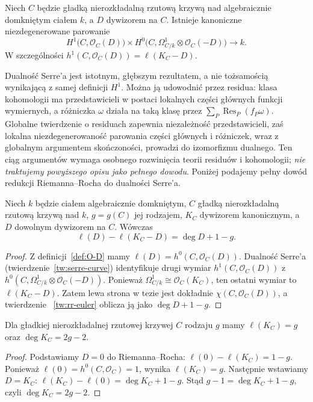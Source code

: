 \begin{twierdzenie}
\label{tw:serre-curve}
Niech $C$ będzie gładką nierozkładalną rzutową
krzywą nad algebraicznie domkniętym ciałem $k$,
a $D$ dywizorem na $C$. Istnieje kanoniczne
niezdegenerowane parowanie
\[
 H^1\bigl(C,\mathcal O_C(D)\bigr)
 \times H^0\bigl(C,\Omega^1_{C/k}\otimes
 \mathcal O_C(-D)\bigr)\longrightarrow k.
\]
W szczególności
$h^1(C,\mathcal O_C(D))=\ell(K_C-D)$.
\end{twierdzenie}

\begin{uwaga}
Dualność Serre'a jest istotnym, głębszym rezultatem,
a nie tożsamością wynikającą z samej definicji
$H^1$. Można ją udowodnić przez residua:
klasa kohomologii ma przedstawicieli w postaci
lokalnych części głównych funkcji wymiernych,
a różniczka $\omega$ działa na taką klasę przez
$\sum_P\operatorname{Res}_P(f_P\omega)$.
Globalne twierdzenie o residuach zapewnia
niezależność przedstawicieli, zaś lokalna
niezdegenerowaność parowania części głównych
i różniczek, wraz z globalnym argumentem
skończoności, prowadzi do izomorfizmu dualnego.
Ten ciąg argumentów wymaga osobnego rozwinięcia
teorii residuów i kohomologii; \emph{nie traktujemy
powyższego opisu jako pełnego dowodu}.
Poniżej podajemy pełny dowód redukcji
Riemanna--Rocha do dualności Serre'a.
\end{uwaga}

\begin{twierdzenie}
\label{tw:rr}
Niech $k$ będzie ciałem algebraicznie domkniętym,
$C$ gładką nierozkładalną rzutową krzywą nad $k$,
$g=g(C)$ jej rodzajem, $K_C$ dywizorem kanonicznym,
a $D$ dowolnym dywizorem na $C$. Wówczas
\[
 \ell(D)-\ell(K_C-D)=\deg D+1-g.
\]
\end{twierdzenie}
\begin{proof}
Z definicji~\ref{def:O-D} mamy
$\ell(D)=h^0(C,\mathcal O_C(D))$.
Dualność Serre'a (twierdzenie~\ref{tw:serre-curve})
identyfikuje drugi wymiar
$h^1(C,\mathcal O_C(D))$ z
$h^0(C,\Omega^1_{C/k}\otimes\mathcal O_C(-D))$.
Ponieważ $\Omega^1_{C/k}\cong\mathcal O_C(K_C)$,
ten ostatni wymiar to $\ell(K_C-D)$.
Zatem lewa strona w tezie jest dokładnie
$\chi(C,\mathcal O_C(D))$, a twierdzenie
~\ref{tw:rr-euler} oblicza ją jako
$\deg D+1-g$.
\end{proof}

\begin{wniosek}
\label{wn:degK}
Dla gładkiej nierozkładalnej rzutowej krzywej
$C$ rodzaju $g$ mamy $\ell(K_C)=g$
oraz $\deg K_C=2g-2$.
\end{wniosek}
\begin{proof}
Podstawiamy $D=0$ do Riemanna--Rocha:
$\ell(0)-\ell(K_C)=1-g$. Ponieważ
$\ell(0)=h^0(C,\mathcal O_C)=1$,
wynika $\ell(K_C)=g$. Następnie wstawiamy
$D=K_C$: $\ell(K_C)-\ell(0)=\deg K_C+1-g$.
Stąd $g-1=\deg K_C+1-g$, czyli
$\deg K_C=2g-2$.
\end{proof}

